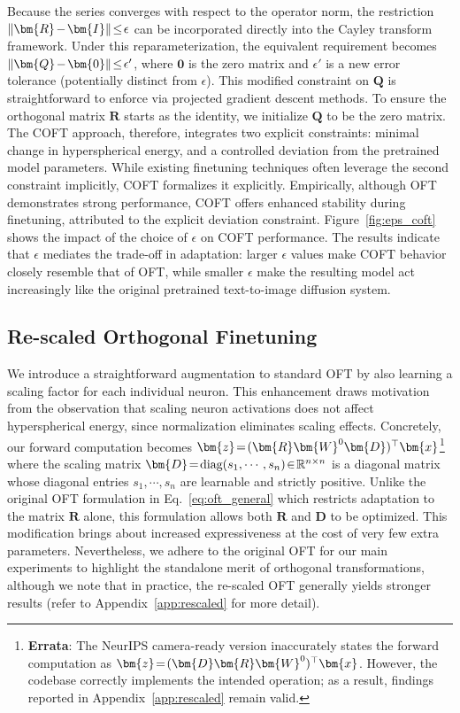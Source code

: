 Because the series converges with respect to the operator norm, the restriction $\thickmuskip=2mu \medmuskip=2mu\|\bm{R}-\bm{I}\|\leq\epsilon$ can be incorporated directly into the Cayley transform framework. Under this reparameterization, the equivalent requirement becomes $\thickmuskip=2mu \medmuskip=2mu \|\bm{Q}-\bm{0}\|\leq\epsilon'$, where $\bm{0}$ is the zero matrix and $\epsilon'$ is a new error tolerance (potentially distinct from $\epsilon$). This modified constraint on $\bm{Q}$ is straightforward to enforce via projected gradient descent methods. To ensure the orthogonal matrix $\bm{R}$ starts as the identity, we initialize $\bm{Q}$ to be the zero matrix. The COFT approach, therefore, integrates two explicit constraints: minimal change in hyperspherical energy, and a controlled deviation from the pretrained model parameters. While existing finetuning techniques often leverage the second constraint implicitly, COFT formalizes it explicitly. Empirically, although OFT demonstrates strong performance, COFT offers enhanced stability during finetuning, attributed to the explicit deviation constraint. Figure~\ref{fig:eps_coft} shows the impact of the choice of $\epsilon$ on COFT performance. The results indicate that $\epsilon$ mediates the trade-off in adaptation: larger $\epsilon$ values make COFT behavior closely resemble that of OFT, while smaller $\epsilon$ make the resulting model act increasingly like the original pretrained text-to-image diffusion system.

\subsection{Re-scaled Orthogonal Finetuning}

We introduce a straightforward augmentation to standard OFT by also learning a scaling factor for each individual neuron. This enhancement draws motivation from the observation that scaling neuron activations does not affect hyperspherical energy, since normalization eliminates scaling effects. Concretely, our forward computation becomes $\thickmuskip=2mu \medmuskip=2mu\bm{z}=(\bm{R}\bm{W}^0\bm{D})^\top\bm{x}$\footnote{\textbf{Errata}: The NeurIPS camera-ready version inaccurately states the forward computation as $\thickmuskip=2mu \medmuskip=2mu\bm{z}=(\bm{D}\bm{R}\bm{W}^0)^\top\bm{x}$. However, the codebase correctly implements the intended operation; as a result, findings reported in Appendix~\ref{app:rescaled} remain valid.} where the scaling matrix $\thickmuskip=2mu \medmuskip=2mu\bm{D}=\text{diag}(s_1,\cdots,s_n)\in\mathbb{R}^{n\times n}$ is a diagonal matrix whose diagonal entries $s_1,\cdots,s_n$ are learnable and strictly positive. Unlike the original OFT formulation in Eq.~\eqref{eq:oft_general} which restricts adaptation to the matrix $\bm{R}$ alone, this formulation allows both $\bm{R}$ and $\bm{D}$ to be optimized. This modification brings about increased expressiveness at the cost of very few extra parameters. Nevertheless, we adhere to the original OFT for our main experiments to highlight the standalone merit of orthogonal transformations, although we note that in practice, the re-scaled OFT generally yields stronger results (refer to Appendix~\ref{app:rescaled} for more detail).

